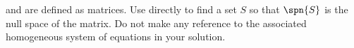  and  are defined as matrices.  Use  directly to find a set $S$ so that $\spn{S}$ is the null space of the matrix.  Do not make any reference to the associated homogeneous system of equations in your solution.